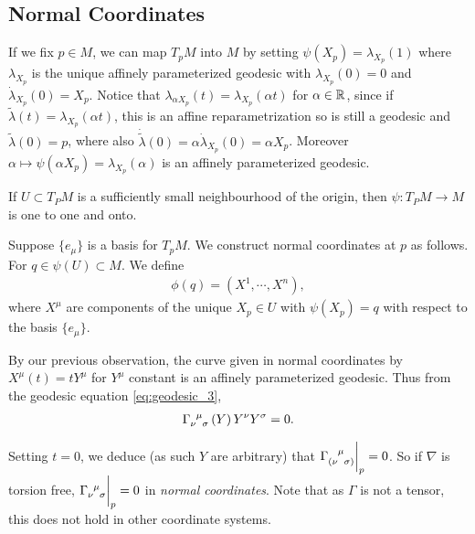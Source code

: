 \subsection{Normal Coordinates}

If we fix $p \in M$, we can map $T_p M$ into $M$ by setting $\psi \left( X_p \right) = \lambda_{X_p}\left( 1 \right) $ where $\lambda_{X_p}$ is the unique affinely parameterized geodesic with $\lambda_{X_p}\left( 0 \right) = 0$ and $\dot{\lambda}_{X_p}\left( 0 \right) = X_p$. Notice that $\lambda_{\alpha X_{p}}\left( t \right) = \lambda_{X_p} \left( \alpha t \right) $ for $\alpha \in \mathbb{R}$, since if $\widetilde{\lambda}\left( t \right) = \lambda_{X_p}\left( \alpha t \right) $, this is an affine reparametrization so is still a geodesic and $\widetilde{\lambda}\left( 0 \right) = p$, where also $\dot{\widetilde{\lambda}}\left( 0 \right) = \alpha \dot{\lambda}_{X_p}\left( 0 \right) = \alpha X_p$. Moreover $\alpha \mapsto \psi \left( \alpha X_p \right) = \lambda_{X_p}\left( \alpha \right)  $ is an affinely parameterized geodesic.

\begin{claim}
    If $U \subset T_P M$ is a sufficiently small neighbourhood of the origin, then $\psi : T_P M \to M$ is one to one and onto.
\end{claim}

\begin{definition}
    Suppose $\{e_{\mu}\} $ is a basis for $T_p M$. We construct normal coordinates at $p$ as follows. For $q \in \psi \left( U \right) \subset M $. We define
    \begin{align}
        \phi \left( q \right) = \left( X^{1}, \cdots, X^{n} \right) 
    ,\end{align}
    where $X^{\mu}$ are components of the unique $X_p \in U$ with $\psi \left( X_p \right) = q$ with respect to the basis $\{e_{\mu}\} $.
\end{definition}

By our previous observation, the curve given in normal coordinates by $X^{\mu}\left( t \right) = t Y^{\mu}$ for $Y^{\mu}$ constant is an affinely parameterized geodesic. Thus from the geodesic equation \cref{eq:geodesic_3},
\begin{align}
    \tensor{\Gamma}{_{\nu}^{\mu}_{\sigma}}\left( Y \right) Y^{\nu} Y^{\sigma} = 0
.\end{align}

Setting $t = 0$, we deduce (as such $Y$ are arbitrary) that $\tensor{\Gamma}{_{(\nu}^{\mu}_{\sigma)}} \bigg|_{p} = 0$. So if $\nabla$ is torsion free, $\tensor{\Gamma}{_{\nu}^{\mu}_\sigma}\bigg|_{p} = 0$ in \textit{normal coordinates}. Note that as $\Gamma$ is not a tensor, this does not hold in other coordinate systems.

